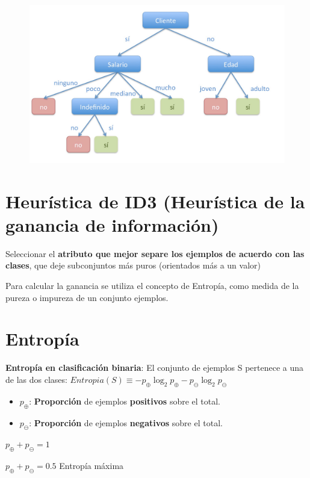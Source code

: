 \documentclass[12pt]{report} %
\begin{document}
\begin{figure}[H]
	{\includegraphics[scale=.2]{Untitled 9.png}}
\end{figure}


\section{Heurística de ID3 (Heurística de la ganancia de
información)}

Seleccionar el \textbf{atributo que mejor separe los ejemplos de acuerdo
con las clases}, que deje subconjuntos más puros (orientados más a un
valor)

Para calcular la ganancia se utiliza el concepto de Entropía, como
medida de la pureza o impureza de un conjunto ejemplos.
\newpage
\section{Entropía}

\textbf{Entropía en clasificación binaria}: El conjunto de ejemplos S
pertenece a una de las dos clases:
\textbf{\(Entropia(S) \equiv -p_\oplus \log _2 p_\oplus -p_\ominus \log _2 p_\ominus\)}

\begin{itemize}
\item
  \(p_\oplus\): \textbf{Proporción} de ejemplos \textbf{positivos} sobre
  el total.
\item
  \(p_\ominus\): \textbf{Proporción} de ejemplos \textbf{negativos}
  sobre el total.
\end{itemize}

\(p_\oplus+p_\ominus=1\)

\(p_\oplus+p_\ominus=0.5\) Entropía máxima
\end{document}
